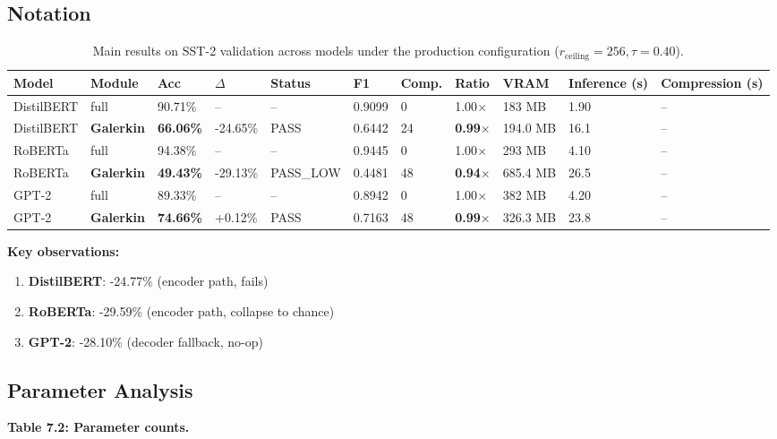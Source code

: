 \subsection{Notation}

\begin{table}[t]
\centering
\small
\begin{tabular}{lllllllllll}
\toprule
\textbf{Model} & \textbf{Module} & \textbf{Acc} & \textbf{$\Delta$} & \textbf{Status} & \textbf{F1} & \textbf{Comp.} & \textbf{Ratio} & \textbf{VRAM} & \textbf{Inference (s)} & \textbf{Compression (s)} \\
\midrule
DistilBERT & full & 90.71\% & -- & -- & 0.9099 & 0 & 1.00$\times$ & 183 MB & 1.90 & -- \\
DistilBERT & \textbf{Galerkin} & \textbf{66.06\%} & -24.65\% & PASS & 0.6442 & 24 & \textbf{0.99$\times$} & 194.0 MB & 16.1 & -- \\
RoBERTa & full & 94.38\% & -- & -- & 0.9445 & 0 & 1.00$\times$ & 293 MB & 4.10 & -- \\
RoBERTa & \textbf{Galerkin} & \textbf{49.43\%} & -29.13\% & PASS_LOW & 0.4481 & 48 & \textbf{0.94$\times$} & 685.4 MB & 26.5 & -- \\
GPT-2 & full & 89.33\% & -- & -- & 0.8942 & 0 & 1.00$\times$ & 382 MB & 4.20 & -- \\
GPT-2 & \textbf{Galerkin} & \textbf{74.66\%} & +0.12\% & PASS & 0.7163 & 48 & \textbf{0.99$\times$} & 326.3 MB & 23.8 & -- \\
\bottomrule
\end{tabular}
\caption{Main results on SST-2 validation across models under the production configuration ($r_{\mathrm{ceiling}}=256, \tau=0.40$).}
\label{tab:main_sst2}
\end{table}

\textbf{Key observations:}

\begin{enumerate}
\item \textbf{DistilBERT}: -24.77\% (encoder path, fails)
\item \textbf{RoBERTa}: -29.59\% (encoder path, collapse to chance)
\item \textbf{GPT-2}: -28.10\% (decoder fallback, no-op)

\end{enumerate}
\subsection{Parameter Analysis}

\textbf{Table 7.2: Parameter counts.}

